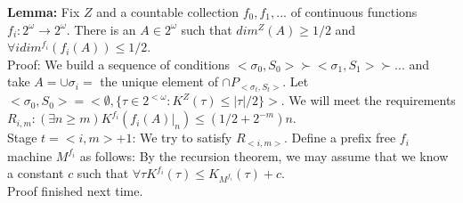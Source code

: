 \documentclass{article}
\begin{document}
   \textbf{Lemma:} Fix $Z$ and a countable collection $f_0,f_1,...$ of continuous functions $f_i : 2^\omega \to 2^\omega$. There is an $A \in 2^\omega$ such that $dim^Z(A) \geq 1/2$ and $\forall i dim^{f_i}(f_i(A)) \leq 1/2$. 
   \\Proof: We build a sequence of conditions $<\sigma_0,S_0> \succ <\sigma_1, S_1> \succ ...$ and take $A = \cup \sigma_i = $ the unique element of $\cap P_{<\sigma_t,S_t>}$.
   Let $<\sigma_0,S_0> = <\emptyset , \{\tau \in 2^{<\omega}: K^Z(\tau) \leq |\tau|/2\}>$. We will meet the requirements \\
   $R_{i,m}: (\exists n \geq m) K^{f_i}(f_i(A)|_n) \leq (1/2 + 2^{-m})n$.\\
   Stage $t = <i,m>+1$: We try to satisfy $R_{<i,m>}$. Define a prefix free $f_i$ machine $M^{f_i}$ as follows: By the recursion theorem, we may assume that we know a constant $c$ such that $\forall \tau K^{f_i}(\tau) \leq K_{M^{f_i}}(\tau)+c$. \\
   Proof finished next time.
   \newpage
\end{document}
